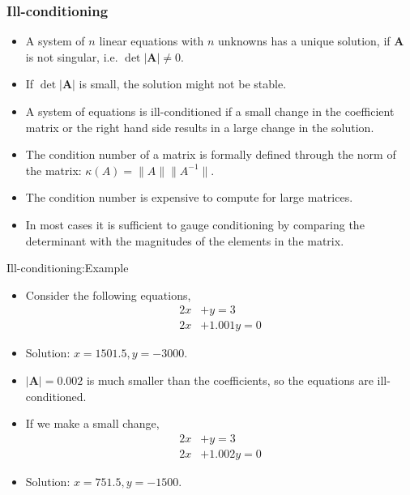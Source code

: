 \documentclass{beamer}
\begin{document}
\begin{frame}[fragile]
\frametitle{Ill-conditioning}
\begin{itemize}
\item A system of $n$ linear equations with  $n$ unknowns has a unique solution, if $\mathbf{A}$ is not singular, i.e. $\det|\mathbf{A}|\ne 0$. 
\item If  $\det|\mathbf{A}|$ is small, the solution might not be stable. 
\item 
A system of equations is  \alert{ill-conditioned} if a \alert{small change} in the 
coefficient matrix or  the right hand side results in a \alert{large change} in the 
solution.
\item The condition number of a matrix is formally defined through the \alert{norm} of the matrix:
$\kappa(A)=\|A \|\|A^{-1}\|$.
\item The condition number is \alert{expensive} to compute for large matrices. 
\item In most cases it is sufficient to gauge conditioning by comparing the \alert{determinant} with the \alert{magnitudes of the elements} in the matrix.
\end{itemize}
\end{frame}
\begin{frame}{Ill-conditioning:Example}
\begin{itemize}
\item Consider the following equations,
\begin{align*}
2x&+y =3 \\
2x&+1.001y =0
\end{align*}
\item Solution: $x=1501.5, y=-3000$.
\item $|\mathbf{A}|=0.002$ is much smaller than the coefficients, so the equations are ill-conditioned.
\item If we make a small change,
\begin{align*}
2x&+y =3 \\
2x&+1.002y =0
\end{align*}
\item Solution: $x = 751.5, y = -1500$.
\end{itemize}
\end{frame}
\end{document}
